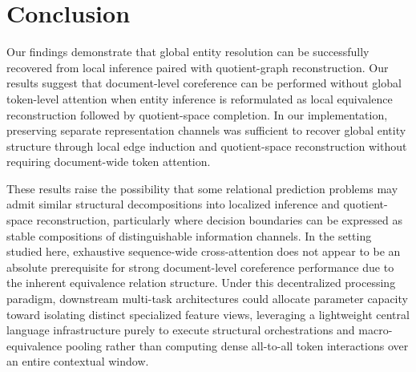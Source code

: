\documentclass[12pt]{article}
\begin{document}
	\section{Conclusion}\label{sec:conclusion}
	Our findings demonstrate that global entity resolution can be successfully recovered from local inference paired with quotient-graph reconstruction. Our results suggest that document-level coreference can be performed without global token-level attention when entity inference is reformulated as local equivalence reconstruction followed by quotient-space completion. In our implementation, preserving separate representation channels was sufficient to recover global entity structure through local edge induction and quotient-space reconstruction without requiring document-wide token attention.
	
	These results raise the possibility that some relational prediction problems may admit similar structural decompositions into localized inference and quotient-space reconstruction, particularly where decision boundaries can be expressed as stable compositions of distinguishable information channels. In the setting studied here, exhaustive sequence-wide cross-attention does not appear to be an absolute prerequisite for strong document-level coreference performance due to the inherent equivalence relation structure. Under this decentralized processing paradigm, downstream multi-task architectures could allocate parameter capacity toward isolating distinct specialized feature views, leveraging a lightweight central language infrastructure purely to execute structural orchestrations and macro-equivalence pooling rather than computing dense all-to-all token interactions over an entire contextual window.
	
	
	
\end{document}

